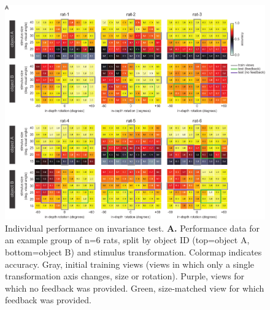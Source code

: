 \begin{figure}[t!]
\includegraphics[width=\textwidth]{figures/supplemental/fig_s3_heatmaps_per_rat/fig_s3_heatmaps_per_rat.pdf}
    \caption[Individual invariance performance]{Individual performance on invariance test.
    \textbf{A.} Performance data for an example group of n=6 rats, split by object ID (top=object A, bottom=object B) and stimulus transformation. Colormap indicates accuracy. Gray, initial training views (views in which only a single transformation axis changes, size or rotation). Purple, views for which no feedback was provided. Green, size-matched view for which feedback was provided. 
    \label{supfig:heatmaps}}
\end{figure}

